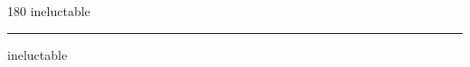
\begin{frame}
\begin{center}
\begin{turn}{180}
{\fontsize{2.5cm}{1em}\selectfont ineluctable}
\end{turn}
\vspace{1em}\par  
\hrule
\vspace{1em}\par  
{\fontsize{2.5cm}{1em}\selectfont ineluctable}
\end{center}
\end{frame}
